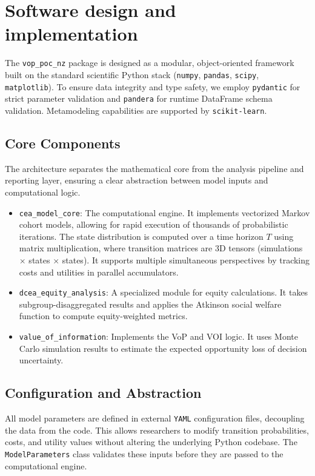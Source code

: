 \documentclass{article}
\newcommand{\pkg}[1]{\texttt{#1}}
\newcommand{\code}[1]{\texttt{#1}}
\begin{document}
\section{Software design and implementation} \label{sec:arch}

The \pkg{vop\_poc\_nz} package is designed as a modular, object-oriented framework built on the standard scientific Python stack (\pkg{numpy}, \pkg{pandas}, \pkg{scipy}, \pkg{matplotlib}).
To ensure data integrity and type safety, we employ \pkg{pydantic} for strict parameter validation and \pkg{pandera} for runtime DataFrame schema validation.
Metamodeling capabilities are supported by \pkg{scikit-learn}.

\subsection{Core Components}
The architecture separates the mathematical core from the analysis pipeline and reporting layer, ensuring a clear abstraction between model inputs and computational logic.
\begin{itemize}
  \item \code{cea\_model\_core}: The computational engine. It implements vectorized Markov cohort models, allowing for rapid execution of thousands of probabilistic iterations. The state distribution is computed over a time horizon $T$ using matrix multiplication, where transition matrices are 3D tensors (simulations $\times$ states $\times$ states). It supports multiple simultaneous perspectives by tracking costs and utilities in parallel accumulators.
  \item \code{dcea\_equity\_analysis}: A specialized module for equity calculations. It takes subgroup-disaggregated results and applies the Atkinson social welfare function to compute equity-weighted metrics.
  \item \code{value\_of\_information}: Implements the VoP and VOI logic. It uses Monte Carlo simulation results to estimate the expected opportunity loss of decision uncertainty.
\end{itemize}

\subsection{Configuration and Abstraction}
All model parameters are defined in external \code{YAML} configuration files, decoupling the data from the code.
This allows researchers to modify transition probabilities, costs, and utility values without altering the underlying Python codebase.
The \code{ModelParameters} class validates these inputs before they are passed to the computational engine.
\end{document}
